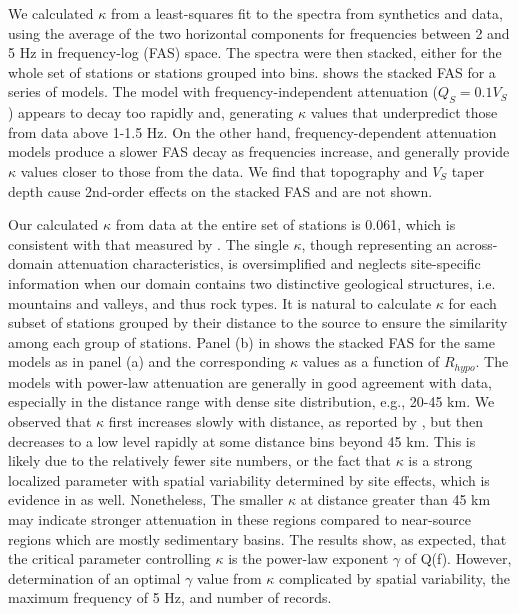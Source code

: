 We calculated $\kappa$ from a least-squares fit to the spectra from synthetics and data, using the average of the two horizontal components for frequencies between 2 and 5 Hz in frequency-log (FAS) space. The spectra were then stacked, either for the whole set of stations or stations grouped into bins. 
 shows the stacked FAS for a series of models.  The model with frequency-independent attenuation ($Q_S=0.1V_S$) appears to decay too rapidly and, generating $\kappa$ values that underpredict those from data above 1-1.5 Hz. On the other hand, frequency-dependent attenuation models produce a slower FAS decay as frequencies increase, and generally provide $\kappa$ values closer to those from the data. We find that topography and $V_S$ taper depth cause 2nd-order effects on the stacked FAS and are not shown.


Our calculated $\kappa$ from data at the entire set of stations is 0.061, which is consistent with that measured by \citet{anderson1984model}. The single $\kappa$, though representing an across-domain attenuation characteristics, is oversimplified and neglects site-specific information when our domain contains two distinctive geological structures, i.e. mountains and valleys, and thus rock types. It is natural to calculate $\kappa$ for each subset of stations grouped by their distance to the source to ensure the similarity among each group of stations. Panel (b) in  shows the stacked FAS for the same models as in panel (a) and the corresponding $\kappa$ values as a function of $R_{hypo}$. The models with power-law attenuation are generally in good agreement with data, especially in the distance range with dense site distribution, e.g., 20-45 km. We observed that $\kappa$ first increases slowly with distance, as reported by \citet{anderson1984model}, but then decreases to a low level rapidly at some distance bins beyond 45 km. This is likely due to the relatively fewer site numbers, or the fact that $\kappa$ is a strong localized parameter with spatial variability determined by site effects, which is evidence in \citet{anderson1984model} as well. Nonetheless, The smaller $\kappa$ at distance greater than 45 km may indicate stronger attenuation in these regions compared to near-source regions which are mostly sedimentary basins.
The results show, as expected, that the
critical parameter controlling $\kappa$ is the power-law exponent $\gamma$ of Q(f). However, determination of an optimal $\gamma$ value from $\kappa$ complicated by spatial variability, the maximum frequency of 5 Hz, and number of records.


